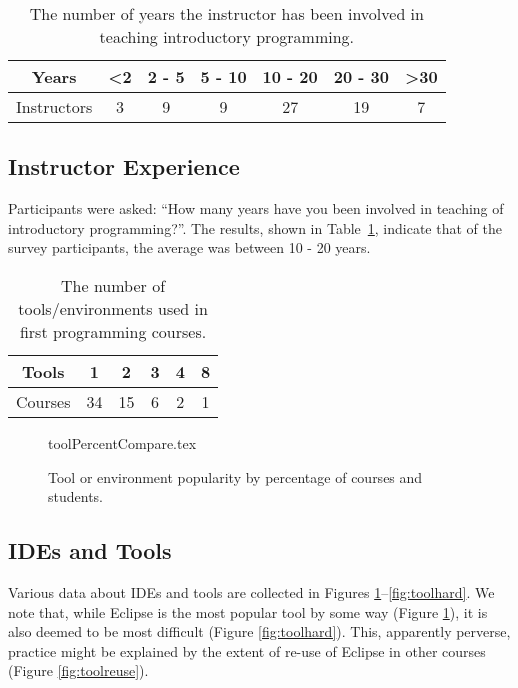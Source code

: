 \documentclass{sig-alternate}
\begin{document}
\begin{table}[h]
\centering
\caption{The number of years the instructor has been involved in teaching introductory programming.}
\label{tab:yearsTeaching}
\begin{tabular}{ccccccc}
\hline
Years       & \textless 2 & 2 - 5 & 5 - 10 & 10 - 20 & 20 - 30 & \textgreater 30 \\ \hline
Instructors & 3          & 9     & 9      & 27      & 19      & 7              \\ \hline
\end{tabular}
\end{table}

\subsection{Instructor Experience}

Participants were asked: ``How many years have you been involved in
teaching of introductory programming?''. The results, shown in
Table~\ref{tab:yearsTeaching}, indicate that of the survey
participants, the average was between 10 - 20 years.

\begin{table}[]
\centering
\caption{The number of tools/environments used in first programming courses.}
\label{tab:numTools}
\begin{tabular}{cccccc}
\hline
Tools   & 1  & 2  & 3 & 4 & 8 \\ \hline
Courses & 34 & 15 & 6 & 2 & 1 \\ \hline
\end{tabular}
\end{table}

\begin{figure}
\begin{center}
{toolPercentCompare.tex}
\caption{Tool or environment popularity by percentage of courses and students.\label{fig:tools}}
\end{center}
\end{figure}

\subsection{IDEs and Tools}

Various data about IDEs and tools are collected in Figures
\ref{fig:tools}--\ref{fig:toolhard}. We note that, while Eclipse is
the most popular tool by some way (Figure \ref{fig:tools}), it is also
deemed to be most difficult (Figure \ref{fig:toolhard}). This,
apparently perverse, practice might be explained by the extent of
re-use of Eclipse in other courses (Figure \ref{fig:toolreuse}).
\end{document}
